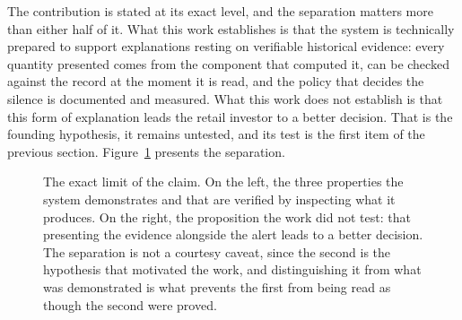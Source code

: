 The contribution is stated at its exact level, and the separation matters more than either half
of it. What this work establishes is that the system is technically prepared to support
explanations resting on verifiable historical evidence: every quantity presented comes from the
component that computed it, can be checked against the record at the moment it is read, and the
policy that decides the silence is documented and measured. What this work does not establish is
that this form of explanation leads the retail investor to a better decision. That is the founding
hypothesis, it remains untested, and its test is the first item of the previous section.
Figure~\ref{fig:con_fronteira} presents the separation.

\begin{figure}[!htbp]
\centering
{}
\caption[The boundary of what the work establishes]{The exact limit of the claim. On the left, the
three properties the system demonstrates and that are verified by inspecting what it produces. On
the right, the proposition the work did not test: that presenting the evidence alongside the alert
leads to a better decision. The separation is not a courtesy caveat, since the second is the
hypothesis that motivated the work, and distinguishing it from what was demonstrated is what
prevents the first from being read as though the second were proved.}
\label{fig:con_fronteira}
\end{figure}
